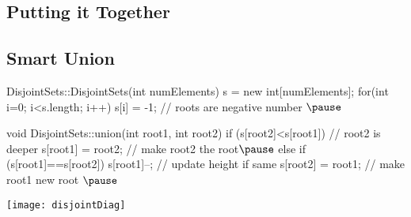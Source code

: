 
\begin{slide}
\section[-2]{Putting it Together}
\pb

\begin{center}
  \pause
\end{center}

\end{slide}


\begin{slide}
\section[-2]{Smart Union}

\begin{PauseHighLight}
\begin{java}
    DisjointSets::DisjointSets(int numElements)
    {
        s = new int[numElements];
        for(int i=0; i<s.length; i++)
            s[i] = -1;                   // roots are negative number
    }$\pause$

    void DisjointSets::union(int root1, int root2)
    {
        if (s[root2]<s[root1]) {         // root2 is deeper
            s[root1] = root2;            // make root2 the root$\pause$
        } else {
            if (s[root1]==s[root2])      
                s[root1]--;              // update height if same
            s[root2] = root1;            // make root1 new root
        }
    }$\pause$
\end{java}
\begin{center}
  \texttt{[image: disjointDiag]}
\end{center}
\end{PauseHighLight}
\end{slide}


